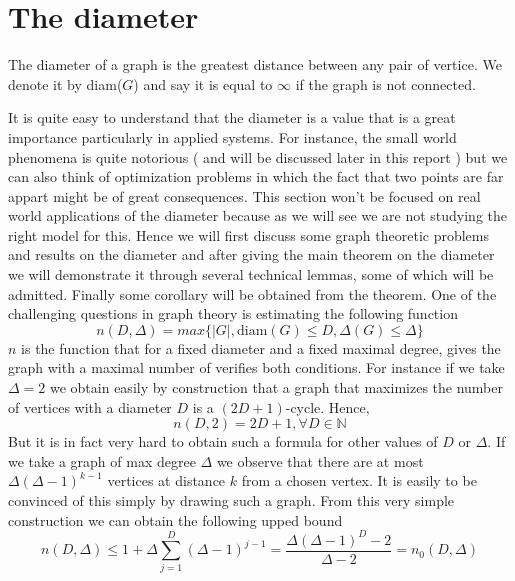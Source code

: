 \section{The diameter}

\begin{definition}
	The diameter of a graph is the greatest distance between any pair of vertice. We denote it by diam($G$) and say it is equal to $\infty$ if the graph is not connected.
\end{definition}
It is quite easy to understand that the diameter is a value that is a great importance particularly in applied systems. For instance, the small world phenomena is quite notorious ( and will be discussed later in this report ) but we can also think of optimization problems in which the fact that two points are far appart might be of great consequences.
This section won't be focused on real world applications of the diameter because as we will see we are not studying the right model for this. 
Hence we will first discuss some graph theoretic problems and results on the diameter and after giving the main theorem on the diameter we will demonstrate it through several technical lemmas, some of which will be admitted. Finally some corollary will be obtained from the theorem.
\newline
One of the challenging questions in graph theory is estimating the following function
\begin{equation}
	n(D, \Delta) = max\{ |G|, \text{diam}(G) \leq D, \Delta(G) \leq \Delta\}
\end{equation}
$n$ is the function that for a fixed diameter and a fixed maximal degree, gives the graph with a maximal number of verifies both conditions.
\newline
For instance if we take $\Delta = 2$ we obtain easily by construction that a graph that maximizes the number of vertices with a diameter $D$ is a $(2D+1)$-cycle. Hence, 
\begin{equation}
	n(D, 2) = 2D + 1, \forall D \in \mathbb{N}
\end{equation}
But it is in fact very hard to obtain such a formula for other values of $D$ or $\Delta$.
\newline
If we take a graph of max degree $\Delta$ we observe that there are at most $\Delta (\Delta - 1)^{k-1}$ vertices at distance $k$ from a chosen vertex. It is easily to be convinced of this simply by drawing such a graph. 
From this very simple construction we can obtain the following upped bound
\begin{equation}
	n(D, \Delta) \leq 1 + \Delta \sum_{j=1}^{D}(\Delta - 1)^{j-1} = \frac{\Delta(\Delta - 1)^D - 2}{\Delta - 2} = n_0(D, \Delta)
\end{equation}
